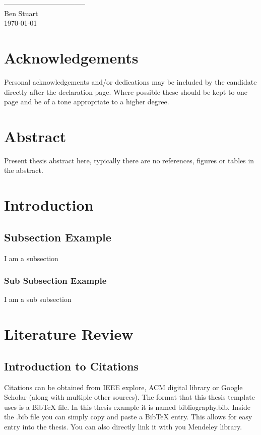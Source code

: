 \documentclass[12pt]{article}
\begin{document}
\vspace{2cm}
\begin{flushright}
-----------------------------------\\
Ben Stuart\\
\today
\end{flushright}
\pagebreak

\section*{Acknowledgements}
Personal acknowledgements and/or dedications may be included by the candidate directly after the declaration page. Where possible these should be kept to one page and be of a tone appropriate to a higher degree.
\pagebreak

\listoffigures
\pagebreak
 
\listoftables
\pagebreak


\tableofcontents
\pagebreak

\section*{Abstract}
Present thesis abstract here, typically there are no references, figures or tables in the abstract.
\pagebreak




\section{Introduction}
\subsection{Subsection Example}
I am a subsection
\subsubsection{Sub Subsection Example}
I am a sub subsection
\pagebreak




\section{Literature Review}
\subsection{Introduction to Citations}
Citations can be obtained from IEEE explore, ACM digital library or Google Scholar (along with multiple other sources). The format that this thesis template uses is a BibTeX file. In this thesis example it is named bibliography.bib. Inside the .bib file you can simply copy and paste a BibTeX entry. This allows for easy entry into the thesis. You can also directly link it with you Mendeley library.
\end{document}
